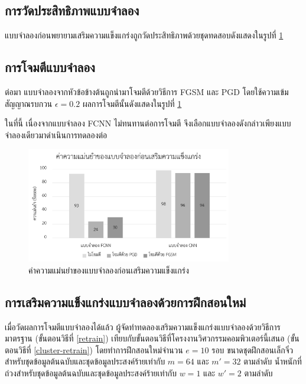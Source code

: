 \subsection{การวัดประสิทธิภาพแบบจำลอง}

แบบจำลองก่อนพยายามเสริมความแข็งแกร่งถูกวัดประสิทธิภาพด้วยชุดทดสอบดังแสดงในรูปที่ \ref{acc-before}

\subsection{การโจมตีแบบจำลอง}

ต่อมา แบบจำลองจากหัวข้อข้างต้นถูกนำมาโจมตีด้วยวิธีการ FGSM และ PGD โดยใช้ความเข้มสัญญาณรบกวน $\epsilon = 0.2$ ผลการโจมตีนั้นดังแสดงในรูปที่ \ref{acc-before}

ในที่นี้ เนื่องจากแบบจำลอง FCNN ไม่ทนทานต่อการโจมตี จึงเลือกแบบจำลองดังกล่าวเพียงแบบจำลองเดียวมาดำเนินการทดลองต่อ

\begin{figure}
    \centering
    \includegraphics[width=0.8\textwidth]{images/acc-before.pdf}
    \caption{ค่าความแม่นยำของแบบจำลองก่อนเสริมความแข็งแกร่ง}
    \label{acc-before}
\end{figure}

\subsection{การเสริมความแข็งแกร่งแบบจำลองด้วยการฝึกสอนใหม่}

เมื่อวัดผลการโจมตีแบบจำลองได้แล้ว ผู้จัดทำทดลองเสริมความแข็งแกร่งแบบจำลองด้วยวิธีการมาตรฐาน (ขั้นตอนวิธีที่ \ref{retrain}) เทียบกับขั้นตอนวิธีที่โครงงานวิศวกรรมคอมพิวเตอร์นี้เสนอ (ขั้นตอนวิธีที่ \ref{cluster-retrain}) โดยทำการฝึกสอนใหม่จำนวน $e=10$ รอบ ขนาดชุดฝึกสอนเล็กจิ๋วสำหรับชุดข้อมูลต้นฉบับและชุดข้อมูลประสงค์ร้ายเท่ากับ $m=64$ และ $m'=32$ ตามลำดับ น้ำหนักที่ถ่วงสำหรับชุดข้อมูลต้นฉบับและชุดข้อมูลประสงค์ร้ายเท่ากับ $w=1$ และ $w'=2$ ตามลำดับ

